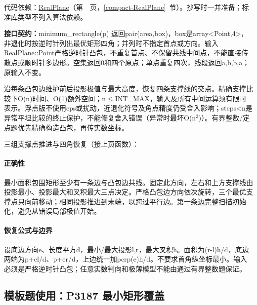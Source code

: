 代码依赖：\hyperref[compact-RealPlane]{RealPlane}（第~\pageref{compact-RealPlane}~页，\ref{compact-RealPlane}~节）。抄写时一并准备；标准库类型不列入算法依赖。

{\sloppy{}\noindent\textbf{接口契约：}minimum\_rectangle(p) 返回pair(area,box)，box是array<Point,4>，非退化时按逆时针列出最优矩形四角；并列时不指定首点或方向。输入RealPlane::Point严格逆时针凸包，不重复首点、不保留共线中间点，不能直接传散点或顺时针多边形。空集返回0和四个原点；单点重复四次，线段返回a,b,b,a；原输入不变。

沿每条凸包边维护前后投影极值与最大高度，恢复四条支撑线的交点。精确支撑比较下O(n)时间、O(1)额外空间；n$\le$INT\_MAX，输入及所有中间运算须有限可表示。浮点版不使用eps或扰动，近退化符号及角点精度仍受舍入影响；steps<n是异常平坦比较的终止保护，不能修复舍入错误（异常时最坏O(n$^{2}$)）。有界整数/定点题优先精确构造凸包，再传实数坐标。\par}

\Needspace{400pt}



\newpage

三组支撑点推进与四角恢复（接上页函数）：



\paragraph{正确性} 最小面积包围矩形至少有一条边与凸包边共线。固定此方向，左右和上方支撑线由投影最小、投影最大和叉积最大三点决定。严格凸包边方向依次旋转，三个最优支撑点只向前移动；相同投影推进到末端，以跨过平行边。第一条边完整扫描初始化，避免从错误局部极值开始。

\paragraph{恢复公式与边界} 设底边方向e、长度平方d，最小/最大投影l,r，最大叉积h。面积为(r-l)h/d，底边两端为p+el/d、p+er/d，上边统一加perp(e)h/d。不要求首角纵坐标最小。输入必须是严格逆时针凸包；任意实数判向和极薄模型不能由通过有界整数题保证。

\newpage

\Needspace{436pt}

\subsection*{模板题使用：P3187 最小矩形覆盖}

